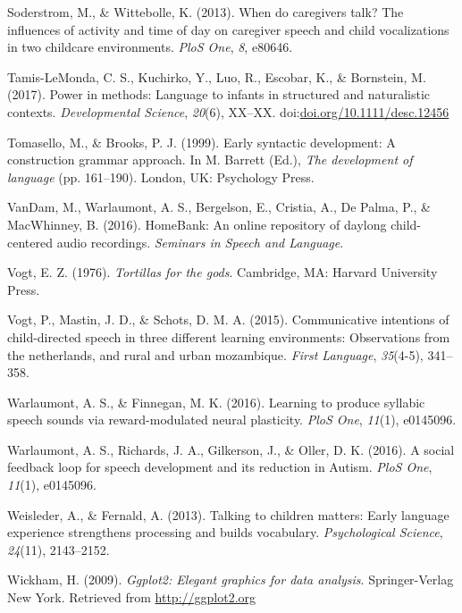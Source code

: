 \documentclass[floatsintext,man]{apa6}
\theoremstyle{definition}
\theoremstyle{definition}
\theoremstyle{definition}
\theoremstyle{remark}
\begin{document}
\hypertarget{ref-soderstrom2013when}{}
Soderstrom, M., \& Wittebolle, K. (2013). When do caregivers talk? The
influences of activity and time of day on caregiver speech and child
vocalizations in two childcare environments. \emph{PloS One}, \emph{8},
e80646.

\hypertarget{ref-tamislemonda2017power}{}
Tamis-LeMonda, C. S., Kuchirko, Y., Luo, R., Escobar, K., \& Bornstein,
M. (2017). Power in methods: Language to infants in structured and
naturalistic contexts. \emph{Developmental Science}, \emph{20}(6),
XX--XX.
doi:\href{https://doi.org/doi.org/10.1111/desc.12456}{doi.org/10.1111/desc.12456}

\hypertarget{ref-tomasello1999early}{}
Tomasello, M., \& Brooks, P. J. (1999). Early syntactic development: A
construction grammar approach. In M. Barrett (Ed.), \emph{The
development of language} (pp. 161--190). London, UK: Psychology Press.

\hypertarget{ref-HomeBank}{}
VanDam, M., Warlaumont, A. S., Bergelson, E., Cristia, A., De Palma, P.,
\& MacWhinney, B. (2016). HomeBank: An online repository of daylong
child-centered audio recordings. \emph{Seminars in Speech and Language}.

\hypertarget{ref-vogt1976tortillas}{}
Vogt, E. Z. (1976). \emph{Tortillas for the gods}. Cambridge, MA:
Harvard University Press.

\hypertarget{ref-vogt2015communicative}{}
Vogt, P., Mastin, J. D., \& Schots, D. M. A. (2015). Communicative
intentions of child-directed speech in three different learning
environments: Observations from the netherlands, and rural and urban
mozambique. \emph{First Language}, \emph{35}(4-5), 341--358.

\hypertarget{ref-warlaumont2016learning}{}
Warlaumont, A. S., \& Finnegan, M. K. (2016). Learning to produce
syllabic speech sounds via reward-modulated neural plasticity.
\emph{PloS One}, \emph{11}(1), e0145096.

\hypertarget{ref-warlaumont2014social}{}
Warlaumont, A. S., Richards, J. A., Gilkerson, J., \& Oller, D. K.
(2016). A social feedback loop for speech development and its reduction
in Autism. \emph{PloS One}, \emph{11}(1), e0145096.

\hypertarget{ref-weisleder2013talking}{}
Weisleder, A., \& Fernald, A. (2013). Talking to children matters: Early
language experience strengthens processing and builds vocabulary.
\emph{Psychological Science}, \emph{24}(11), 2143--2152.

\hypertarget{ref-R-ggplot2}{}
Wickham, H. (2009). \emph{Ggplot2: Elegant graphics for data analysis}.
Springer-Verlag New York. Retrieved from \url{http://ggplot2.org}
\end{document}
